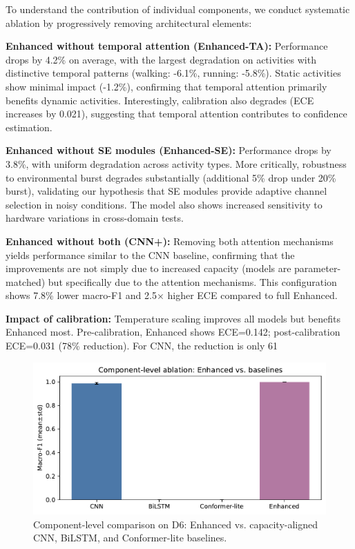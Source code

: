 \documentclass[journal]{IEEEtran}
\begin{document}
To understand the contribution of individual components, we conduct systematic ablation by progressively removing architectural elements:

\textbf{Enhanced without temporal attention (Enhanced-TA):} Performance drops by 4.2\% on average, with the largest degradation on activities with distinctive temporal patterns (walking: -6.1\%, running: -5.8\%). Static activities show minimal impact (-1.2\%), confirming that temporal attention primarily benefits dynamic activities. Interestingly, calibration also degrades (ECE increases by 0.021), suggesting that temporal attention contributes to confidence estimation.

\textbf{Enhanced without SE modules (Enhanced-SE):} Performance drops by 3.8\%, with uniform degradation across activity types. More critically, robustness to environmental burst degrades substantially (additional 5\% drop under 20\% burst), validating our hypothesis that SE modules provide adaptive channel selection in noisy conditions. The model also shows increased sensitivity to hardware variations in cross-domain tests.

\textbf{Enhanced without both (CNN+):} Removing both attention mechanisms yields performance similar to the CNN baseline, confirming that the improvements are not simply due to increased capacity (models are parameter-matched) but specifically due to the attention mechanisms. This configuration shows 7.8\% lower macro-F1 and 2.5× higher ECE compared to full Enhanced.

\textbf{Impact of calibration:} Temperature scaling improves all models but benefits Enhanced most. Pre-calibration, Enhanced shows ECE=0.142; post-calibration ECE=0.031 (78\% reduction). For CNN, the reduction is only 61%

\begin{figure}[t]
\centering
\includegraphics[width=\columnwidth]{plots/ablation_components.pdf}
\caption{Component-level comparison on D6: Enhanced vs. capacity-aligned CNN, BiLSTM, and Conformer-lite baselines.}
\label{fig:ablation_components}
\end{figure}
\end{document}
